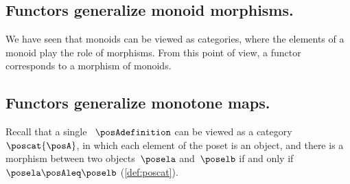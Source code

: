 
\subsection[\dots as  monotone maps]{Functors generalize monoid morphisms.}
\label{sec:functors-generalize-monoid-morphisms}


We have seen that monoids can be viewed as categories, where the elements of a monoid play the role of morphisms.
From this point of view, a functor corresponds to a morphism of monoids.

\subsection[\dots as  monotone maps]{Functors generalize monotone maps.}
\label{sec:posetsarecats}


Recall that a single ~$\posAdefinition$ can be viewed as a category $\poscat{\posA}$, in which each element of the poset is an object, and there is a morphism between two objects~$\posela$ and~$\poselb$ if and only if~$\posela \posAleq \poselb$ (\cref{def:poscat}).



